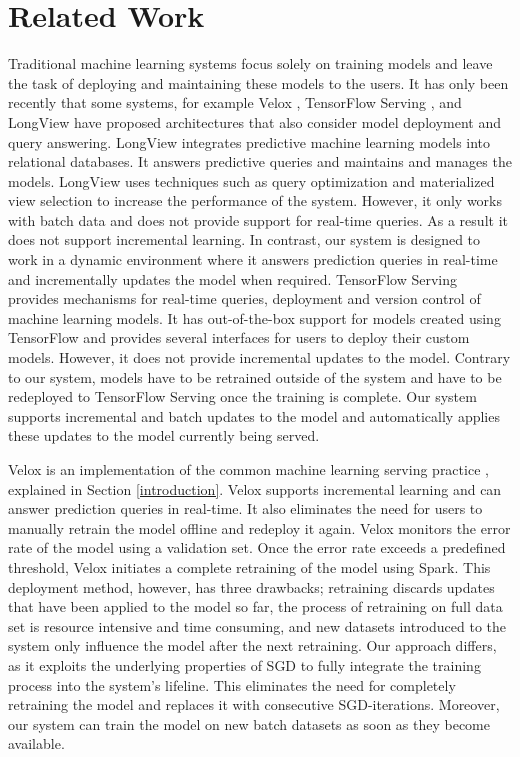 \documentclass[10pt,conference,letterpaper]{IEEEtran}
\begin{document}
\section{Related Work} \label{related-work}
Traditional machine learning systems focus solely on training models and leave the task of deploying and maintaining these models to the users.
It has only been recently that some systems, for example Velox \cite{crankshaw2014missing}, TensorFlow Serving \cite{abadi2016tensorflow}, and LongView \cite{akdere2011case} have proposed architectures that also consider model deployment and query answering.
LongView integrates predictive machine learning models into relational databases. 
It answers predictive queries and maintains and manages the models.
LongView uses techniques such as query optimization and materialized view selection to increase the performance of the system.
However, it only works with batch data and does not provide support for real-time queries. 
As a result it does not support incremental learning.
In contrast, our system is designed to work in a dynamic environment where it answers prediction queries in real-time and incrementally updates the model when required.
TensorFlow Serving provides mechanisms for real-time queries, deployment and version control of machine learning models.
It has out-of-the-box support for models created using TensorFlow and provides several interfaces for users to deploy their custom models.
However, it does not provide incremental updates to the model.
Contrary to our system, models have to be retrained outside of the system and have to be redeployed to TensorFlow Serving once the training is complete.
Our system supports incremental and batch updates to the model and automatically applies these updates to the model currently being served.

Velox is an implementation of the common machine learning serving practice \cite{crankshaw2014missing}, explained in Section \ref{introduction}.
Velox supports incremental learning and can answer prediction queries in real-time.
It also eliminates the need for users to manually retrain the model offline and redeploy it again.
Velox monitors the error rate of the model using a validation set.
Once the error rate exceeds a predefined threshold, Velox initiates a complete retraining of the model using Spark. 
This deployment method, however, has three drawbacks; retraining discards updates that have been applied to the model so far, the process of retraining on full data set is resource intensive and time consuming, and new datasets introduced to the system only influence the model after the next retraining.
Our approach differs, as it exploits the underlying properties of SGD to fully integrate the training process into the system's lifeline.
This eliminates the need for completely retraining the model and replaces it with consecutive SGD-iterations.
Moreover, our system can train the model on new batch datasets as soon as they become available.
\end{document}

